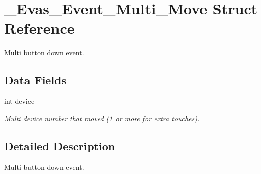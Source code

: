 \section{\_\-Evas\_\-Event\_\-Multi\_\-Move Struct Reference}
\label{struct__Evas__Event__Multi__Move}


Multi button down event.  


\subsection*{Data Fields}
\begin{DoxyCompactItemize}
\item 
int \hyperlink{struct__Evas__Event__Multi__Move_a664db8b96c8999777c79e9ba165d124a}{device}\label{struct__Evas__Event__Multi__Move_a664db8b96c8999777c79e9ba165d124a}

\begin{DoxyCompactList}\small\item\em Multi device number that moved (1 or more for extra touches). \item\end{DoxyCompactList}\end{DoxyCompactItemize}


\subsection{Detailed Description}
Multi button down event. 